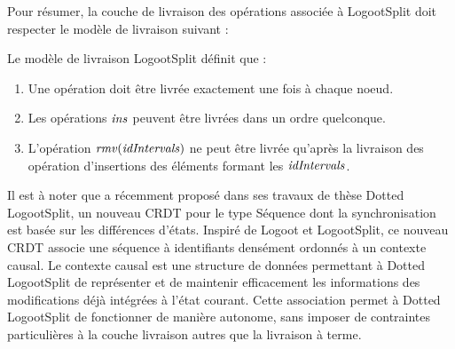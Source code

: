 Pour résumer, la couche de livraison des opérations associée à LogootSplit doit respecter le modèle de livraison suivant :

\begin{definition}
  \label{def:ls-delivery-model}
  Le modèle de livraison LogootSplit définit que :
  \begin{enumerate}
    \item Une opération doit être livrée exactement une fois à chaque noeud.
    \item Les opérations $\mathit{ins}$ peuvent être livrées dans un ordre quelconque.
    \item L'opération $\mathit{rmv}(\mathit{idIntervals})$ ne peut être livrée qu'après la livraison des opération d'insertions des éléments formant les $\mathit{idIntervals}$.
  \end{enumerate}
\end{definition}

Il est à noter que \textcite{2021-these-vic} a récemment proposé dans ses travaux de thèse Dotted LogootSplit, un nouveau \ac{CRDT} pour le type Séquence dont la synchronisation est basée sur les différences d'états.
Inspiré de Logoot et LogootSplit, ce nouveau \ac{CRDT} associe une séquence à identifiants densément ordonnés à un contexte causal.
Le contexte causal est une structure de données permettant à Dotted LogootSplit de représenter et de maintenir efficacement les informations des modifications déjà intégrées à l'état courant.
Cette association permet à Dotted LogootSplit de fonctionner de manière autonome, sans imposer de contraintes particulières à la couche livraison autres que la livraison à terme.
